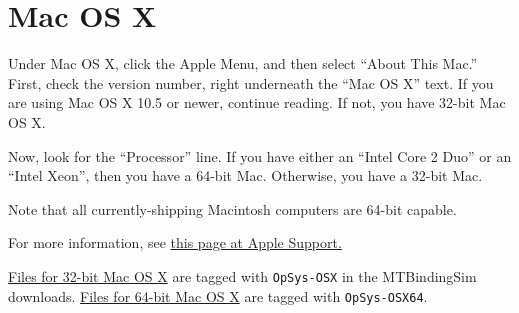 \section{Mac OS X%
}

\noindent{}

Under Mac OS X, click the Apple Menu, and then select ``About This Mac.''
First, check the version number, right underneath the ``Mac OS X'' text.
If you are using Mac OS X 10.5 or newer, continue reading.  If not, you
have 32-bit Mac OS X.

Now, look for the ``Processor'' line.  If you have either an ``Intel Core 2
Duo'' or an ``Intel Xeon'', then you have a 64-bit Mac.  Otherwise, you have
a 32-bit Mac.

Note that all currently-shipping Macintosh computers are 64-bit capable.

For more information, see \href{http://support.apple.com/kb/ht3696}{this page at Apple Support.}

\href{http://code.google.com/p/mtbindingsim/downloads/list?q=OpSys-OSX}{Files for 32-bit Mac OS X}
are tagged with \texttt{OpSys-OSX} in the MTBindingSim downloads. \href{http://code.google.com/p/mtbindingsim/downloads/list?q=OpSys-OSX64}{Files for 64-bit
Mac OS X}
are tagged with \texttt{OpSys-OSX64}.

